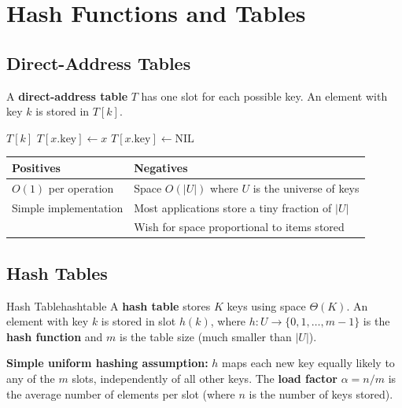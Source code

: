 \section*{Hash Functions and Tables}

\subsection{Direct-Address Tables}

A \textbf{direct-address table} $T$ has one slot for each possible key. An element with
key $k$ is stored in $T[k]$.

\begin{algorithm}[H]
\caption{Direct-Address Table Operations}
\begin{algorithmic}[1]
  \State \Return $T[k]$
\EndProcedure
{}
  \State $T[x.\text{key}] \gets x$
\EndProcedure
{}
  \State $T[x.\text{key}] \gets \text{NIL}$
\EndProcedure
\end{algorithmic}
\end{algorithm}

\begin{center}
\begin{tabular}{ll}
\toprule
\textbf{Positives} & \textbf{Negatives} \\
\midrule
$O(1)$ per operation & Space $O(|U|)$ where $U$ is the universe of keys \\
Simple implementation & Most applications store a tiny fraction of $|U|$ \\
                       & Wish for space proportional to items stored \\
\bottomrule
\end{tabular}
\end{center}

\subsection{Hash Tables}

\begin{definition}{Hash Table}{hashtable}
A \textbf{hash table} stores $K$ keys using space $\Theta(K)$. An element with key $k$
is stored in slot $h(k)$, where $h: U \to \{0, 1, \ldots, m-1\}$ is the \textbf{hash function}
and $m$ is the table size (much smaller than $|U|$).

\textbf{Simple uniform hashing assumption:} $h$ maps each new key equally likely to any of
the $m$ slots, independently of all other keys. The \textbf{load factor} $\alpha = n/m$
is the average number of elements per slot (where $n$ is the number of keys stored).
\end{definition}

